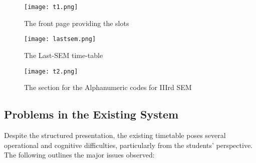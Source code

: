 \documentclass[a4paper,12pt]{article}
\begin{document}
\begin{figure}[H]
    \centering
    \texttt{[image: t1.png]}
    \caption{The front page providing the slots}
    \label{fig:placeholder}
\end{figure}
\begin{figure}[H]
    \centering
    \texttt{[image: lastsem.png]}
    \caption{The Last-SEM time-table}
    \label{fig:placeholder}
\end{figure}
\begin{figure}[H]
    \centering
    \texttt{[image: t2.png]}
    \caption{The section for the Alphanumeric codes for IIIrd SEM}
    \label{fig:placeholder}
\end{figure}
\newpage
\subsection{Problems in the Existing System}
Despite the structured presentation, the existing timetable poses several operational and cognitive difficulties, particularly from the students’ perspective. The following outlines the major issues observed:
\end{document}
